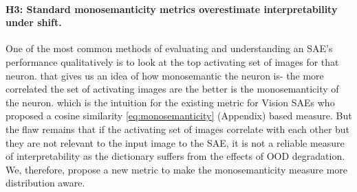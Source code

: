\paragraph{H3: Standard monosemanticity metrics overestimate interpretability under shift.}
\label{sec:exp:h3}
One of the most common methods of evaluating and understanding an SAE's performance qualitatively is to look at the top activating set of images for that neuron. that gives us an idea of how monosemantic the neuron is- the more correlated the set of activating images are the better is the monosemanticity of the neuron. which is the intuition for the existing metric for Vision SAEs \citep{pach2025monosemantic} who proposed a cosine similarity \ref{eq:monosemanticity} (Appendix) based measure. But the flaw remains that if the activating set of images correlate with each other but they are not relevant to the input image to the SAE, it is not a reliable measure of interpretability as the dictionary suffers from the effects of OOD degradation. We, therefore, propose a new metric to make the monosemanticity measure more distribution aware. \vspace{-2mm}


